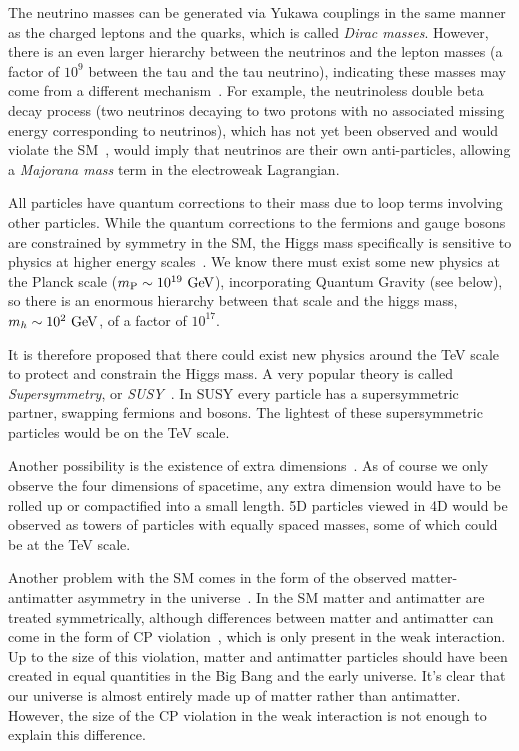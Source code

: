 The neutrino masses can be generated via Yukawa couplings in the same manner as the charged leptons and the quarks, which is called \textit{Dirac masses}.
However, there is an even larger hierarchy between the neutrinos and the lepton masses (a factor of $10^9$ between the tau and the tau neutrino), indicating these masses may come from a different mechanism~\cite{King:2003jb}.
For example, the neutrinoless double beta decay process (two neutrinos decaying to two protons with no associated missing energy corresponding to neutrinos), which has not yet been observed and would violate the SM~\cite{Schwingenheuer:2012zs}, would imply that neutrinos are their own anti-particles, allowing a \textit{Majorana mass} term in the electroweak Lagrangian.

All particles have quantum corrections to their mass due to loop terms involving other particles.
While the quantum corrections to the fermions and gauge bosons are constrained by symmetry in the SM, the Higgs mass specifically is sensitive to physics at higher energy scales~\cite{Csaki:2016kln,deGouvea:2014xba}.
We know there must exist some new physics at the Planck scale ($m_\text{P}\sim10^{19}~\mathrm{GeV}$), incorporating Quantum Gravity (see below), so there is an enormous hierarchy between that scale and the higgs mass, $m_h\sim 10^2~\mathrm{GeV}$, of a factor of $10^{17}$.

It is therefore proposed that there could exist new physics around the TeV scale to protect and constrain the Higgs mass.
A very popular theory is called \textit{Supersymmetry}, or \textit{SUSY}~\cite{wess_bagger_2009,Wess:1984jr,Lykken:1996xt,Quevedo:2010ui,Strassler:2003qg,Peskin:1997qi,Seiberg:1994pq,Intriligator:2007cp}.
In SUSY every particle has a supersymmetric partner, swapping fermions and bosons.
The lightest of these supersymmetric particles would be on the TeV scale.

Another possibility is the existence of extra dimensions~\cite{Kaluza:1921tu,Klein:1926tv,Einstein:1938fk,Csaki:2004ay,Csaki:2005vy,Rattazzi:2003ea,Ponton:2012bi,Cheng:2010pt}.
As of course we only observe the four dimensions of spacetime, any extra dimension would have to be rolled up or compactified into a small length.
5D particles viewed in 4D would be observed as towers of particles with equally spaced masses, some of which could be at the TeV scale.

Another problem with the SM comes in the form of the observed matter-antimatter asymmetry in the universe~\cite{Canetti:2012zc}.
In the SM matter and antimatter are treated symmetrically, although differences between matter and antimatter can come in the form of CP violation~\cite{Sakharov:1967dj}, which is only present in the weak interaction.
Up to the size of this violation, matter and antimatter particles should have been created in equal quantities in the Big Bang and the early universe.
It's clear that our universe is almost entirely made up of matter rather than antimatter.
However, the size of the CP violation in the weak interaction is not enough to explain this difference.

